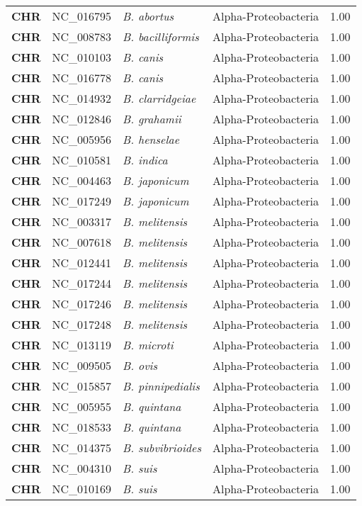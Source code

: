 \begin{adjustwidth}{-3cm}{2cm}
{\begin{supertabular}{>{\bfseries}l|p{0.1\textwidth}p{0.14\textwidth}l|l}
CHR & NC\_016795 & \textit{B. abortus} & Alpha-Proteobacteria & 1.00\\
CHR & NC\_008783 & \textit{B. bacilliformis} & Alpha-Proteobacteria & 1.00\\
CHR & NC\_010103 & \textit{B. canis} & Alpha-Proteobacteria & 1.00\\
CHR & NC\_016778 & \textit{B. canis} & Alpha-Proteobacteria & 1.00\\
CHR & NC\_014932 & \textit{B. clarridgeiae} & Alpha-Proteobacteria & 1.00\\
CHR & NC\_012846 & \textit{B. grahamii} & Alpha-Proteobacteria & 1.00\\
CHR & NC\_005956 & \textit{B. henselae} & Alpha-Proteobacteria & 1.00\\
CHR & NC\_010581 & \textit{B. indica} & Alpha-Proteobacteria & 1.00\\
CHR & NC\_004463 & \textit{B. japonicum} & Alpha-Proteobacteria & 1.00\\
CHR & NC\_017249 & \textit{B. japonicum} & Alpha-Proteobacteria & 1.00\\
CHR & NC\_003317 & \textit{B. melitensis} & Alpha-Proteobacteria & 1.00\\
CHR & NC\_007618 & \textit{B. melitensis} & Alpha-Proteobacteria & 1.00\\
CHR & NC\_012441 & \textit{B. melitensis} & Alpha-Proteobacteria & 1.00\\
CHR & NC\_017244 & \textit{B. melitensis} & Alpha-Proteobacteria & 1.00\\
CHR & NC\_017246 & \textit{B. melitensis} & Alpha-Proteobacteria & 1.00\\
CHR & NC\_017248 & \textit{B. melitensis} & Alpha-Proteobacteria & 1.00\\
CHR & NC\_013119 & \textit{B. microti} & Alpha-Proteobacteria & 1.00\\
CHR & NC\_009505 & \textit{B. ovis} & Alpha-Proteobacteria & 1.00\\
CHR & NC\_015857 & \textit{B. pinnipedialis} & Alpha-Proteobacteria & 1.00\\
CHR & NC\_005955 & \textit{B. quintana} & Alpha-Proteobacteria & 1.00\\
CHR & NC\_018533 & \textit{B. quintana} & Alpha-Proteobacteria & 1.00\\
CHR & NC\_014375 & \textit{B. subvibrioides} & Alpha-Proteobacteria & 1.00\\
CHR & NC\_004310 & \textit{B. suis} & Alpha-Proteobacteria & 1.00\\
CHR & NC\_010169 & \textit{B. suis} & Alpha-Proteobacteria & 1.00\\

\end{supertabular}}
\end{adjustwidth}
